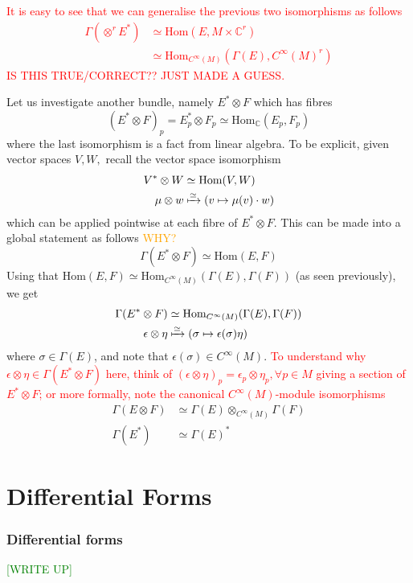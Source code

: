 \documentclass[a4paper]{article}
\theoremstyle{definition} \newtheorem*{definition}{Definition}
\theoremstyle{definition} \newtheorem*{definitions}{Definitions}
\theoremstyle{plain} \newtheorem{theorem}{Theorem}[section]
\theoremstyle{plain} \newtheorem{proposition}[theorem]{Proposition}
\theoremstyle{plain} \newtheorem{corollary}[theorem]{Corollary}
\theoremstyle{plain} \newtheorem{lemma}[theorem]{Lemma}
\theoremstyle{plain} \newtheorem{example}[theorem]{Example}
\newcommand{\checkCorrect}[1]{\textcolor{red}{#1}}
\newcommand{\understandBetter}[1]{\textcolor{orange}{#1}}
\newcommand{\finish}[1]{\textcolor{green}{#1}}
\newcommand{\complexnos}{\mathbb{C}}
\begin{document}
\checkCorrect{
It is easy to see that we can generalise the previous two isomorphisms as follows
\begin{align*}
\Gamma(\otimes^r E^\ast) & \simeq \text{Hom}(E, M\times \complexnos^r) \\
 & \simeq \text{Hom}_{C^\infty (M)}(\Gamma(E), C^\infty (M)^r)
\end{align*}
} \checkCorrect{IS THIS TRUE/CORRECT?? JUST MADE A GUESS.}

Let us investigate another bundle, namely $E^*\otimes F$ which has fibres 
$$(E^*\otimes F)_p=E_p^*\otimes F_p\simeq \text{Hom}_\complexnos (E_p, F_p)$$
where the last isomorphism is a fact from linear algebra. To be explicit, given vector spaces $V, W,$ recall the vector space isomorphism
\begin{align*}
V^*\otimes W & \simeq \text{Hom}(V, W) \\
\mu \otimes w & \xmapsto{\simeq} (v \mapsto \mu(v)\cdot w)
\end{align*}
which can be applied pointwise at each fibre of $E^*\otimes F$. This can be made into a global statement as follows  \understandBetter{WHY?}
$$\Gamma(E^*\otimes F)\simeq \text{Hom}(E,F)$$
Using that $\text{Hom}(E,F)\simeq \text{Hom}_{C^\infty (M)}(\Gamma(E), \Gamma(F))$ (as seen previously), we get
\begin{align*}
\Gamma(E^*\otimes F) & \simeq \text{Hom}_{C^\infty (M)}(\Gamma(E), \Gamma(F)) \\
\epsilon \otimes \eta & \xmapsto{\simeq} (\sigma \mapsto \epsilon(\sigma) \eta)
\end{align*}
where $\sigma\in \Gamma(E)$, and note that $\epsilon(\sigma)\in C^\infty (M)$. \checkCorrect{To understand why $\epsilon \otimes \eta\in \Gamma(E^*\otimes F)$ here, think of $(\epsilon \otimes \eta)_p=\epsilon_p \otimes \eta_p, \forall p\in M$ giving a section of $E^*\otimes F$; or more formally, note the canonical $C^\infty(M)$-module isomorphisms}
\begin{align*}
\Gamma(E\otimes F) & \simeq \Gamma(E)\otimes_{C^\infty (M)} \Gamma(F) \\
\Gamma(E^*) & \simeq \Gamma(E)^* 
\end{align*}

\section{Differential Forms}

\subsubsection{Differential forms}
\finish{[WRITE UP]}
\end{document}
